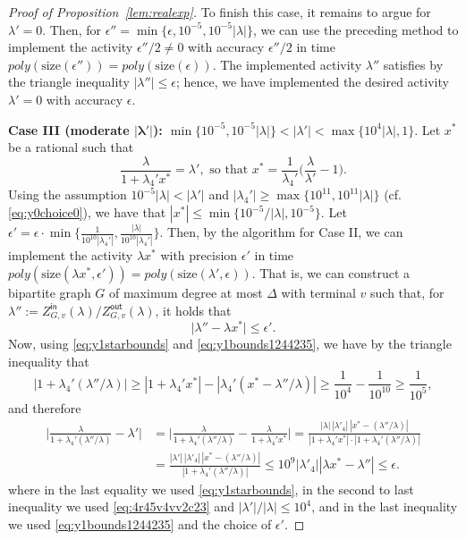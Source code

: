 \documentclass[11pt]{article}
\def\Zin{Z^{\mathsf{in}}}
\def\Zout{Z^{\mathsf{out}}}
\newcommand{\size}[1]{\mathrm{size}(#1)}
\begin{document}
\begin{proof}[Proof of Proposition~\ref{lem:realexp}]
To finish this case, it remains to argue for $\lambda'=0$. Then, for $\epsilon''=\min\{\epsilon,10^{-5},10^{-5}|\lambda|\}$, we can use the preceding method to  implement the activity $\epsilon''/2\neq 0$ with accuracy $\epsilon''/2$ in time $poly(\size{\epsilon''})=poly(\size{\epsilon})$. The implemented activity $\lambda''$ satisfies by the triangle inequality $|\lambda''|\leq \epsilon$; hence, we have implemented the desired activity $\lambda'=0$ with accuracy $\epsilon$.  

\vskip 0.2cm

\noindent \textbf{Case III (moderate $\mathbf{|\lambda'|}$): $\min\{10^{-5},10^{-5}|\lambda|\}<|\lambda'|<\max\{10^{4}|\lambda|,1\}$}. Let $x^*$ be a rational such that 
\begin{equation}\label{eq:y1starbounds}
\frac{\lambda}{1+\lambda_4'  x^*}=\lambda',\mbox{ so that }x^*=\frac{1}{\lambda_4'}\Big(\frac{\lambda}{\lambda'}-1\Big).
\end{equation}
Using the assumption $10^{-5}|\lambda|<|\lambda'|$ and  $|\lambda_4'|\geq \max\{10^{11},10^{11}|\lambda|\}$ (cf. \eqref{eq:y0choice0}), we have that $|x^*|\leq \min\{10^{-5}/|\lambda|, 10^{-5}\}$. Let $\epsilon'=\epsilon\cdot \min\big\{\frac{1}{10^{10}|\lambda_4'|},\frac{|\lambda|}{10^{10}|\lambda_4'|}\big\}$.  Then, by the algorithm for Case II, we can implement the activity $\lambda x^*$ with precision $\epsilon'$ in time $poly(\size{\lambda x^*,\epsilon'})=poly(\size{\lambda',\epsilon})$. That is, we can construct a bipartite graph $G$ of maximum degree at most $\Delta$ with terminal $v$ such that, for  $\lambda'':=\Zin_{G,v}(\lambda)/\Zout_{G,v}(\lambda)$, it holds that
\begin{equation}\label{eq:y1bounds1244235}
\big|\lambda''- \lambda x^*\big|\leq \epsilon'.
\end{equation}
Now, using \eqref{eq:y1starbounds} and \eqref{eq:y1bounds1244235}, we have by the triangle inequality that
\begin{equation}\label{eq:4r45v4vv2c23}
|1+ \lambda_4'(\lambda''/\lambda)|\geq |1+ \lambda_4' x^*|-|\lambda_4' (x^*-\lambda''/\lambda)|\geq \frac{1}{10^4}- \frac{1}{10^{10}}\geq \frac{1}{10^5},
\end{equation}
and therefore
\begin{equation}\label{eq:v4v4v35g3f2ftgb}
\begin{aligned}
\Big|\frac{\lambda}{1+ \lambda_4'(\lambda''/\lambda)}-\lambda'\Big|&=\Big|\frac{\lambda}{1+ \lambda_4'(\lambda''/\lambda)}-\frac{\lambda}{1+ \lambda_4'x^*}\Big|=\frac{|\lambda|\, |\lambda'_4|\, |x^*-(\lambda''/\lambda)|}{|1+ \lambda_4'x^*|\cdot |1+ \lambda_4'(\lambda''/\lambda)|}\\
&= \frac{|\lambda'|\, |\lambda'_4|\, |x^*-(\lambda''/\lambda)|}{|1+ \lambda_4'(\lambda''/\lambda)|}\leq 10^9 |\lambda'_4| |\lambda x^*-\lambda''|\leq \epsilon.
\end{aligned}
\end{equation}
where in the last equality we used \eqref{eq:y1starbounds}, in the second to last inequality we used \eqref{eq:4r45v4vv2c23} and $|\lambda'|/|\lambda|\leq 10^4$, and in the last inequality we used \eqref{eq:y1bounds1244235} and the choice of $\epsilon'$.



\end{proof}
\end{document}
